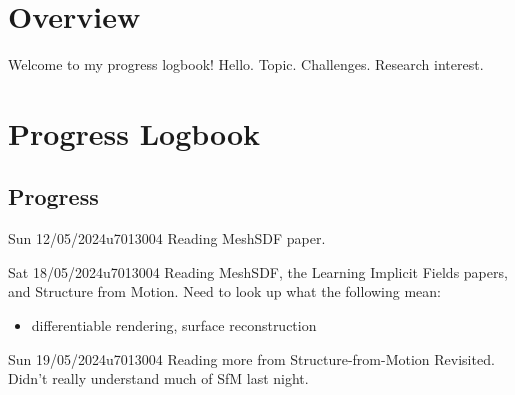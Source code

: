 \documentclass{project-logbook}
\begin{document}

\MakeFrontPage



\newpage

\section{Overview}\label{sec:overview}
\begin{HighlightedNote}{Welcome to my progress logbook!}
	Hello. Topic. Challenges. Research interest.
\end{HighlightedNote}


\section{Progress Logbook}
	\subsection{Progress}
	\begin{MeetingMinutes}{Sun 12/05/2024}{u7013004}
		Reading MeshSDF paper.
	\end{MeetingMinutes}
	
	\begin{MeetingMinutes}{Sat 18/05/2024}{u7013004}
		Reading MeshSDF, the Learning Implicit Fields papers, and Structure from Motion. Need to look up what the following mean:
		\begin{itemize}
			\item differentiable rendering, surface reconstruction
		\end{itemize}
	\end{MeetingMinutes}
	
	\begin{MeetingMinutes}{Sun 19/05/2024}{u7013004}
		Reading more from Structure-from-Motion Revisited. Didn't really understand much of SfM last night.
	\end{MeetingMinutes}
	
\end{document}

